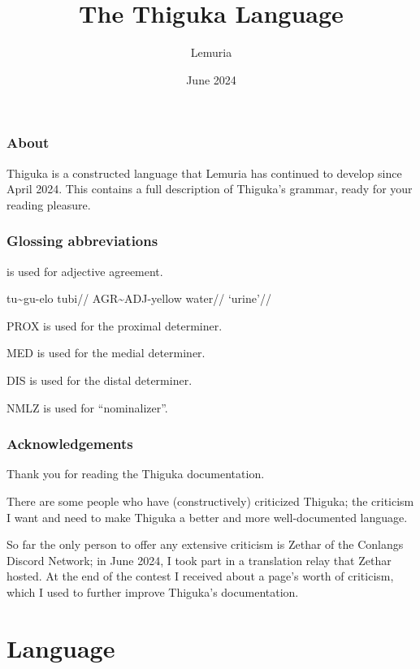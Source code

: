 \documentclass{thigukabook}
\title{The Thiguka Language}
\date{June 2024}
\author{Lemuria}
\begin{document}
\maketitle

\newpage

\thigukacopyright{}


\section*{About}
Thiguka is a constructed language that Lemuria has continued to develop since April 2024.
This contains a full description of Thiguka's grammar, ready for your reading pleasure.

\section*{Glossing abbreviations}
\agradj is used for adjective agreement.

\ex
\begingl
    \gla  tu\~{}{}gu-elo tubi//
    \glb  AGR\~{}ADJ-yellow water//
    \glft `urine'//
\endgl
\xe

PROX is used for the proximal determiner.

MED is used for the medial determiner.

DIS is used for the distal determiner.

NMLZ is used for ``nominalizer''.

\section*{Acknowledgements}
Thank you for reading the Thiguka documentation.

There are some people who have (constructively) criticized Thiguka; the criticism I want and need to make Thiguka a better and more well-documented language.

So far the only person to offer any extensive criticism is Zethar of the Conlangs Discord Network; in June 2024, I took part in a translation relay that Zethar hosted.
At the end of the contest I received about a page's worth of criticism, which I used to further improve Thiguka's documentation.

\tableofcontents

\part{Language}







\end{document}
